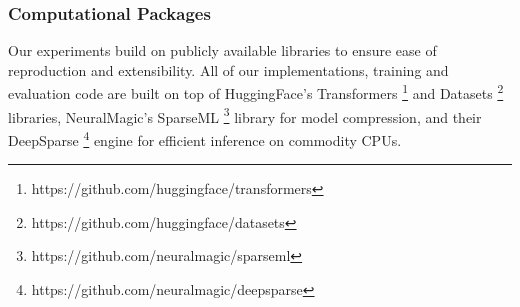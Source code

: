\documentclass[11pt]{article}
\begin{document}
\subsubsection{Computational Packages}
Our experiments build on publicly available libraries to ensure ease of reproduction and extensibility. All of our implementations, training and evaluation code are built on top of HuggingFace's Transformers \footnote{https://github.com/huggingface/transformers} and Datasets \footnote{https://github.com/huggingface/datasets} libraries, NeuralMagic's SparseML \footnote{https://github.com/neuralmagic/sparseml} library for model compression, and their DeepSparse \footnote{https://github.com/neuralmagic/deepsparse} engine for efficient inference on commodity CPUs.
\end{document}
